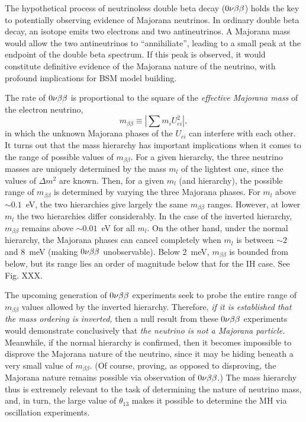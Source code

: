 \documentclass[../thesis.tex]{subfiles}
\begin{document}
The hypothetical process of neutrinoless double beta decay ($0\nu\beta\beta$) holds the
key to potentially observing evidence of Majorana neutrinos. In ordinary double
beta decay, an isotope emits two electrons and two antineutrinos. A Majorana
mass would allow the two antineutrinos to ``annihiliate'', leading to a small
peak at the endpoint of the double beta spectrum. If this peak is observed, it
would constitute definitive evidence of the Majorana nature of the neutrino,
with profound implications for BSM model building.

The rate of $0\nu\beta\beta$ is proportional to the square of the \emph{effective
  Majorana mass} of the electron neutrino,
\begin{equation*}
  m_{\beta\beta} \equiv \left| \sum m_i U^2_{ei} \right|,
\end{equation*}
in which the unknown Majorana phases of the $U_{ei}$ can interfere with each
other. It turns out that the mass hierarchy has important implications when it
comes to the range of possible values of $m_{\beta\beta}$. For a given
hierarchy, the three neutrino masses are uniquely determined by the mass $m_l$
of the lightest one, since the values of $\Delta m^2$ are known. Then, for a
given $m_l$ (and hierarchy), the possible range of $m_{\beta\beta}$ is
determined by varying the three Majorana phases. For $m_l$ above $\sim0.1$~eV,
the two hierarchies give largely the same $m_{\beta\beta}$ ranges. However, at
lower $m_l$ the two hierarchies differ considerably. In the case of the inverted
hierarchy, $m_{\beta\beta}$ remains above $\sim0.01$~eV for all $m_l$. On the
other hand, under the normal hierarchy, the Majorana phases can cancel
completely when $m_l$ is between $\sim2$ and 8~meV (making $0\nu\beta\beta$
unobservable). Below 2~meV, $m_{\beta\beta}$ is bounded from below, but its
range lies an order of magnitude below that for the IH case. See Fig. XXX.

The upcoming generation of $0\nu\beta\beta$ experiments seek to probe the entire range of
$m_{\beta\beta}$ values allowed by the inverted hierarchy. Therefore, \emph{if
  it is established that the mass ordering is inverted,} then a null result from
these $0\nu\beta\beta$ experiments would demonstrate conclusively that \emph{the neutrino
  is not a Majorana particle.} Meanwhile, if the normal hierarchy is confirmed,
then it becomes impossible to disprove the Majorana nature of the neutrino,
since it may be hiding beneath a very small value of $m_{\beta\beta}$. (Of
course, proving, as opposed to disproving, the Majorana nature remains possible
via observation of $0\nu\beta\beta$.) The mass hierarchy thus is extremely relevant to
the task of determining the nature of neutrino mass, and, in turn, the large
value of $\theta_{13}$ makes it possible to determine the MH via oscillation
experiments.
\end{document}
